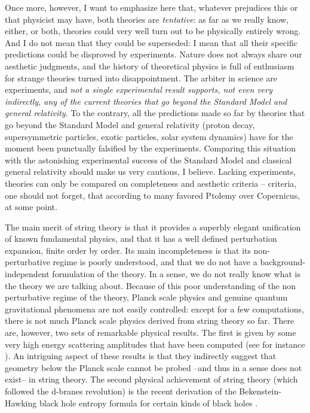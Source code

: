 \documentclass[12pt]{article}
\begin{document}
Once more, however, I want to emphasize here that, whatever prejudices 
this or that physicist may have, both theories are {\em tentative\/}: 
as far as we really know, either, or both, theories could very well 
turn out to be physically entirely wrong.  And I do not mean that they 
could be superseded: I mean that all their specific predictions could 
be disproved by experiments.  Nature does not always share our 
aesthetic judgments, and the history of theoretical physics is full of 
enthusiasm for strange theories turned into disappointment.  The 
arbiter in science are experiments, and {\em not a single experimental 
result supports, not even very indirectly, any of the current theories 
that go beyond the Standard Model and general relativity}.  To the 
contrary, all the predictions made so far by theories that go beyond 
the Standard Model and general relativity (proton decay, 
supersymmetric particles, exotic particles, solar system dynamics) 
have for the moment been punctually falsified by the experiments.  
Comparing this situation with the astonishing experimental success of 
the Standard Model and classical general relativity should make us 
very cautious, I believe.  Lacking experiments, theories can only be 
compared on completeness and aesthetic criteria -- criteria, one 
should not forget, that according to many favored Ptolemy over 
Copernicus, at some point.

The main merit of string theory is that it provides a superbly elegant 
unification of known fundamental physics, and that it has a well 
defined perturbation expansion, finite order by order.  Its main 
incompleteness is that its non-perturbative regime is poorly 
understood, and that we do not have a background-independent 
formulation of the theory.  In a sense, we do not really know what is 
the theory we are talking about.  Because of this poor understanding 
of the non perturbative regime of the theory, Planck scale physics and 
genuine quantum gravitational phenomena are not easily controlled: 
except for a few computations, there is not much Planck scale physics 
derived from string theory so far.   There are, however, two sets of 
remarkable physical results.  The first is given by some very high 
energy scattering amplitudes that have been computed (see for instance 
\cite{AmatiVeneziano,AmatiVeneziano2,%
AmatiVeneziano3,AmatiVeneziano4,Verlinde,t'Hooft}).  An intriguing 
aspect of these results is that they indirectly suggest that geometry 
below the Planck scale cannot be probed --and thus in a sense does not 
exist-- in string theory.  The second physical achievement of string 
theory (which followed the d-branes revolution) is the recent 
derivation of the Bekenstein-Hawking black hole entropy formula for 
certain kinds of black holes 
\cite{StromingerVafa,HorowitzStrominger,HorowitzEtAl1,HorowitzEtAl2}.
\end{document}
